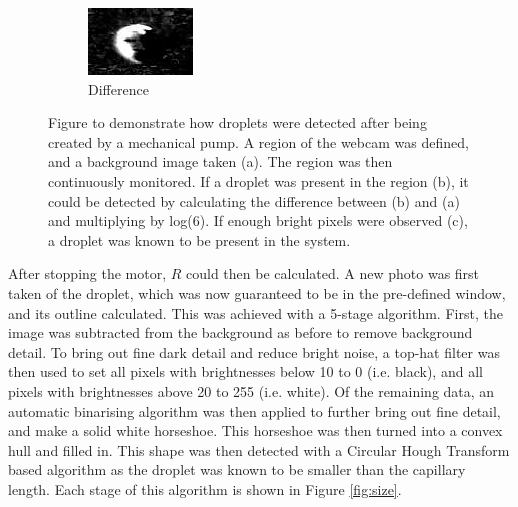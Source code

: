 \documentclass{physics_article_B}
\begin{document}
\begin{figure}[H]
\begin{subfigure}[b]{0.3\textwidth}
                            \includegraphics[width=\textwidth]{Figures/DropFinder/DropFinder3.eps}
                            \caption{Difference}
                            \label{fig:detector:diff}
                        \end{subfigure}
                        \caption{Figure to demonstrate how droplets were detected after being created by a mechanical pump. A region of the webcam was defined, and a background image taken (a). The region was then continuously monitored. If a droplet was present in the region (b), it could be detected by calculating the difference between (b) and (a) and multiplying by log(6). If enough bright pixels were observed (c), a droplet was known to be present in the system.}\label{fig:detector}
                    \end{figure}
            
            After stopping the motor, $R$ could then be calculated. A new photo was first taken of the droplet, which was now guaranteed to be in the pre-defined window, and its outline calculated. This was achieved with a 5-stage algorithm. First, the image was subtracted from the background as before to remove background detail. To bring out fine dark detail and reduce bright noise, a top-hat filter was then used to set all pixels with brightnesses below 10 to 0 (i.e. black), and all pixels with brightnesses above 20 to 255 (i.e. white). Of the remaining data, an automatic binarising algorithm was then applied to further bring out fine detail, and make a solid white horseshoe. This horseshoe was then turned into a convex hull and filled in. This shape was then detected with a Circular Hough Transform based algorithm\cite{imfindcircles} as the droplet was known to be smaller than the capillary length. Each stage of this algorithm is shown in Figure \ref{fig:size}.
            
\end{document}
